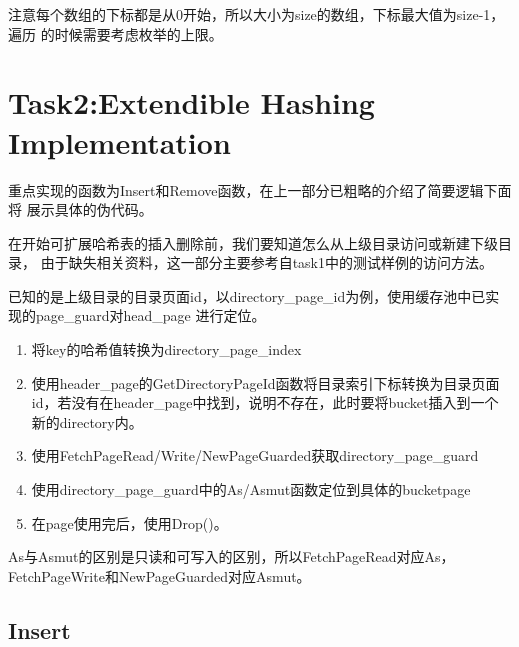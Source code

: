 \documentclass[a4paper]{article}
\begin{document}
注意每个数组的下标都是从0开始，所以大小为size的数组，下标最大值为size-1，遍历
的时候需要考虑枚举的上限。

\section{Task2:Extendible Hashing Implementation}

重点实现的函数为Insert和Remove函数，在上一部分已粗略的介绍了简要逻辑下面将
展示具体的伪代码。

在开始可扩展哈希表的插入删除前，我们要知道怎么从上级目录访问或新建下级目录，
由于缺失相关资料，这一部分主要参考自task1中的测试样例的访问方法。

已知的是上级目录的目录页面id，以directory\_page\_id为例，使用缓存池中已实现的page\_guard对head\_page
进行定位。

\begin{enumerate}
   \item 将key的哈希值转换为directory\_page\_index
   \item 使用header\_page的GetDirectoryPageId函数将目录索引下标转换为目录页面id，若没有在header\_page中找到，说明不存在，此时要将bucket插入到一个新的directory内。
   \item 使用FetchPageRead/Write/NewPageGuarded获取directory\_page\_guard
   \item 使用directory\_page\_guard中的As/Asmut函数定位到具体的bucketpage
   \item 在page使用完后，使用Drop()。
\end{enumerate}

As与Asmut的区别是只读和可写入的区别，所以FetchPageRead对应As，FetchPageWrite和NewPageGuarded对应Asmut。

\subsection{Insert}
\end{document}
